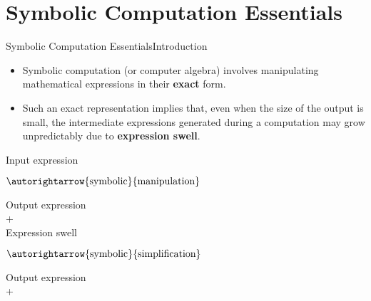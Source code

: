 
\section{Symbolic Computation Essentials}

\begin{frame}
  \tableofcontents[currentsection]
\end{frame}

\begin{frame}{Symbolic Computation Essentials}{Introduction}
  \begin{itemize}
    \item Symbolic computation (or computer algebra) involves manipulating mathematical expressions in their \textbf{exact} form.
    \item Such an exact representation implies that, even when the size of the output is small, the intermediate expressions generated during a computation may grow unpredictably due to \textbf{expression swell}.
  \end{itemize}
  \begin{center}\begin{minipage}{\textwidth}\begin{bbox}
    \centering%
    \begin{minipage}[c]{0.15\textwidth} \centering Input expression \end{minipage}%
    \begin{minipage}[c]{0.19\textwidth} \centering $\autorightarrow{\text{symbolic}}{\text{manipulation}}$ \end{minipage}%
    \begin{minipage}[c]{0.21\textwidth} \centering Output expression \\ + \\ Expression swell \end{minipage}%
    \begin{minipage}[c]{0.19\textwidth} \centering $\autorightarrow{\text{symbolic}}{\text{simplification}}$ \end{minipage}%
    \begin{minipage}[c]{0.21\textwidth} \centering Output expression \\ + \\  \end{minipage}%
  \end{bbox}\end{minipage}\end{center}
\end{frame}

